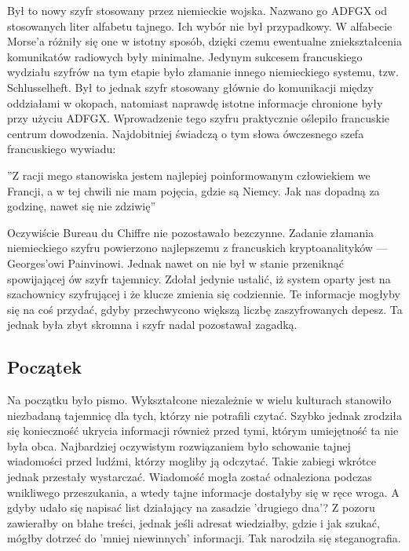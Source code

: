 \documentclass[a4paper, 10pt] {article}
\begin{document}
\raggedright Był to nowy szyfr stosowany przez niemieckie wojska. Nazwano go ADFGX od stosowanych liter alfabetu tajnego. Ich wybór nie był przypadkowy. W alfabecie Morse’a różniły się one w istotny sposób, dzięki czemu ewentualne zniekształcenia komunikatów radiowych były minimalne. Jedynym sukcesem francuskiego wydziału szyfrów na tym etapie było złamanie innego niemieckiego systemu, tzw. Schlusselheft. Był to jednak szyfr stosowany głównie do komunikacji między oddziałami w okopach, natomiast naprawdę istotne informacje chronione były przy użyciu ADFGX. Wprowadzenie tego szyfru praktycznie oślepiło francuskie centrum dowodzenia. Najdobitniej świadczą o tym słowa ówczesnego szefa francuskiego wywiadu:
\begin{center}
”Z racji mego stanowiska jestem najlepiej poinformowanym człowiekiem we Francji, a w tej chwili nie mam pojęcia, gdzie są Niemcy. Jak nas dopadną za godzinę, nawet się nie zdziwię” \cite{latexdps}
\end{center}
Oczywiście Bureau du Chiffre nie pozostawało bezczynne. Zadanie złamania niemieckiego szyfru powierzono najlepszemu z francuskich kryptoanalityków — Georges’owi Painvinowi. Jednak nawet on nie był w stanie przeniknąć spowijającej ów szyfr tajemnicy. Zdołał jedynie ustalić, iż system oparty jest na szachownicy szyfrującej i że klucze zmienia się codziennie. Te informacje mogłyby się na coś przydać, gdyby przechwycono większą liczbę zaszyfrowanych depesz. Ta jednak była zbyt skromna i szyfr nadal pozostawał zagadką.
\subsection{Początek}
Na początku było pismo. Wykształcone niezależnie w wielu kulturach stanowiło niezbadaną tajemnicę dla tych, którzy nie potrafili czytać. Szybko jednak zrodziła się konieczność ukrycia informacji również przed tymi, którym umiejętność ta nie była obca. Najbardziej oczywistym rozwiązaniem było schowanie tajnej wiadomości przed ludźmi, którzy mogliby ją odczytać. Takie zabiegi wkrótce jednak przestały wystarczać. Wiadomość mogła zostać odnaleziona podczas wnikliwego przeszukania, a wtedy tajne informacje dostałyby się w ręce wroga. A gdyby udało się napisać list działający na zasadzie ’drugiego dna’? Z pozoru zawierałby on błahe treści, jednak jeśli adresat wiedziałby, gdzie i jak szukać, mógłby dotrzeć do ’mniej niewinnych’ informacji. Tak narodziła się steganografia.
\end{document}
